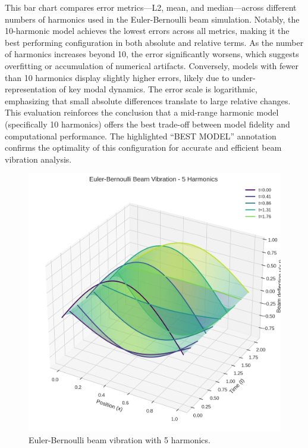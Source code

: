 \documentclass[preprint,12pt]{elsarticle}
\begin{document}
This bar chart compares error metrics—L2, mean, and median—across different numbers of harmonics used in the Euler-Bernoulli beam simulation. Notably, the 10-harmonic model achieves the lowest errors across all metrics, making it the best performing configuration in both absolute and relative terms. As the number of harmonics increases beyond 10, the error significantly worsens, which suggests overfitting or accumulation of numerical artifacts. Conversely, models with fewer than 10 harmonics display slightly higher errors, likely due to under-representation of key modal dynamics. The error scale is logarithmic, emphasizing that small absolute differences translate to large relative changes. This evaluation reinforces the conclusion that a mid-range harmonic model (specifically 10 harmonics) offers the best trade-off between model fidelity and computational performance. The highlighted “BEST MODEL” annotation confirms the optimality of this configuration for accurate and efficient beam vibration analysis.

\begin{figure}[t]
    \centering
    \includegraphics[width=0.9\linewidth]{figures/euler_bernoulli_3d_5h.png}
    \caption{Euler-Bernoulli beam vibration with 5 harmonics.}
    \label{fig:euler_5h}
\end{figure}
\end{document}
